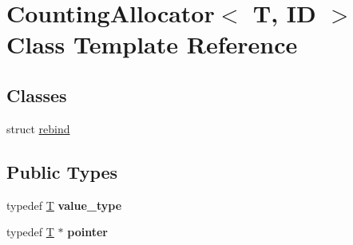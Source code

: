 \hypertarget{class_counting_allocator}{}\section{Counting\+Allocator$<$ T, ID $>$ Class Template Reference}
\label{class_counting_allocator}
\subsection*{Classes}
\begin{DoxyCompactItemize}
\item 
struct \mbox{\hyperlink{struct_counting_allocator_1_1rebind}{rebind}}
\end{DoxyCompactItemize}
\subsection*{Public Types}
\begin{DoxyCompactItemize}
\item 
\mbox{\label{class_counting_allocator_a980892785b13fb308ed6d60495b65bfc}} 
typedef \mbox{\hyperlink{struct_t}{T}} {\bfseries value\+\_\+type}
\item 
\mbox{\label{class_counting_allocator_a92d7f10f38e5eb7de1a6507bad52fd53}} 
typedef \mbox{\hyperlink{struct_t}{T}} $\ast$ {\bfseries pointer}
\end{DoxyCompactItemize}
